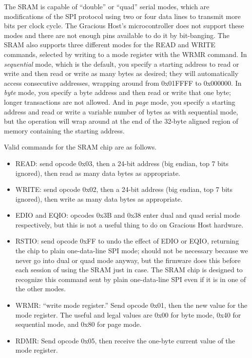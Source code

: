 The SRAM is capable of ``double'' or ``quad'' serial modes, which are
modifications of the SPI protocol using two or four data lines to transmit
more bits per clock cycle.  The Gracious Host's microcontroller does not
support these modes and there are not enough pins available to do it by
bit-banging.  The SRAM also supports three different modes for the READ and
WRITE commands, selected by writing to a mode register with the WRMR
command.  In \emph{sequential} mode, which is the default, you specify a
starting address to read or write and then read or write as many bytes as
desired; they will automatically access consecutive addresses, wrapping
around from 0x01FFFF to 0x000000.  In \emph{byte} mode, you specify a byte
address and then read or write that one byte; longer transactions are not
allowed.  And in \emph{page} mode, you specify a starting address and read
or write a variable number of bytes as with sequential mode, but the
operation will wrap around at the end of the 32-byte aligned region of
memory containing the starting address.

Valid commands for the SRAM chip are as follows.
\begin{itemize}
  \item READ: send opcode 0x03, then a 24-bit address (big endian, top 7
    bits ignored), then read as many data bytes as appropriate.
  \item WRITE: send opcode 0x02, then a 24-bit address (big endian, top 7
    bits ignored), then write as many data bytes as appropriate.
  \item EDIO and EQIO:  opcodes 0x3B and 0x38 enter dual and quad serial
    mode respectively, but this is not a useful thing to do on Gracious Host
    hardware.
  \item RSTIO:  send opcode 0xFF to undo the effect of EDIO or EQIO,
    returning the chip to plain one-data-line SPI mode; should not be
    necessary because we never go into dual or quad mode anyway, but the
    firmware does this before each session of using the SRAM just in case.
    The SRAM chip is designed to recognize this command sent by plain
    one-data-line SPI even if it is in one of the other modes.
  \item WRMR:  ``write mode register.''  Send opcode 0x01, then the new
    value for the mode register.  The useful and legal values are 0x00 for
    byte mode, 0x40 for sequential mode, and 0x80 for page mode.
  \item RDMR:  Send opcode 0x05, then receive the one-byte current value of
    the mode register.
\end{itemize}

